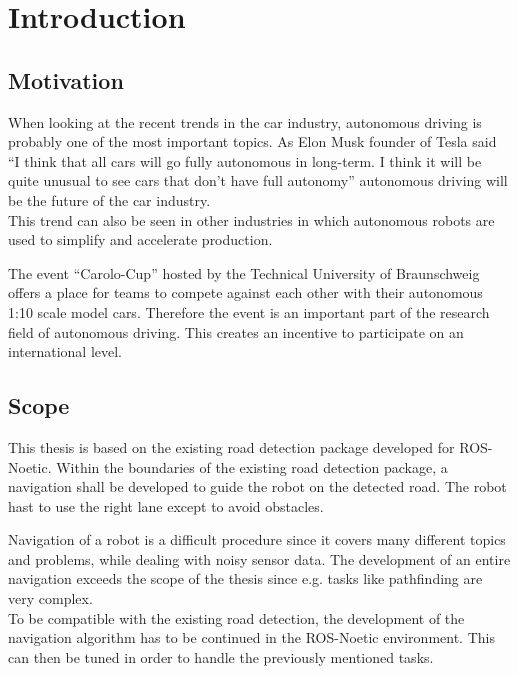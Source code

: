 \chapter{Introduction}
\label{introduction}


\section{Motivation}
When looking at the recent trends in the car industry, autonomous driving is probably one of the most important topics. As Elon Musk founder of Tesla said ``I think that all cars will go fully autonomous in long-term. I think it will be quite unusual to see cars that don’t have full autonomy'' autonomous driving will be the future of the car industry\cite{musk}.\\

This trend can also be seen in other industries in which autonomous robots are used to simplify and accelerate production. 

The event ``Carolo-Cup'' hosted by the Technical University of Braunschweig offers a place for teams to compete against each other with their autonomous 1:10 scale model cars. Therefore the event is an important part of the research field of autonomous driving. This creates an incentive to participate on an international level.

\section{Scope}

This thesis is based on the existing road detection package developed for ROS-Noetic. Within the boundaries of the existing road detection package, a navigation shall be developed to guide the robot on the detected road. The robot hast to use the right lane except to avoid obstacles.

Navigation of a robot is a difficult procedure since it covers many different topics and problems, while dealing with noisy sensor data. The development of an entire navigation exceeds the scope of the thesis since e.g. tasks like pathfinding are very complex.\\

To be compatible with the existing road detection, the development of the navigation algorithm has to be continued in the ROS-Noetic environment. This can then be tuned in order to handle the previously mentioned tasks.\\

